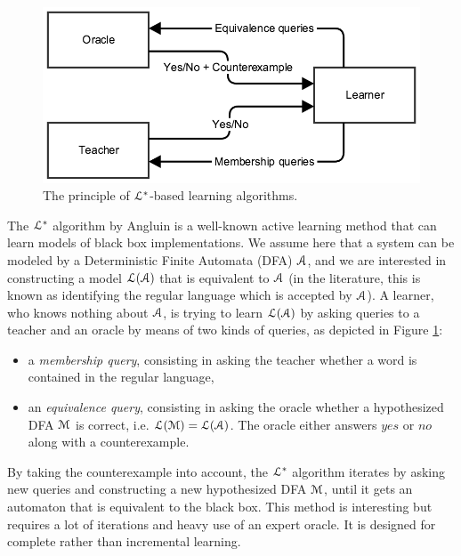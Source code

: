 \begin{figure}[h]
    \begin{center}
        \includegraphics[width=0.9\linewidth]{figures/angluin.png}
    \end{center}

    \caption{The principle of $\EuScript{L}^*$-based learning
    algorithms.}
    \label{fig:angluin}
\end{figure}

The $\EuScript{L}^*$ algorithm by Angluin \cite{Angluin198787} is
a well-known active learning method that can learn models of
black box implementations. We assume here that a system can be
modeled by a Deterministic Finite Automata (DFA) $\EuScript{A}$,
and we are interested in constructing a model
$\EuScript{L}(\EuScript{A})$ that is equivalent to $\EuScript{A}$
(in the literature, this is known as identifying the regular
language which is accepted by $\EuScript{A}$). A learner, who
knows nothing about $\EuScript{A}$, is trying to learn
$\EuScript{L}(\EuScript{A})$ by asking queries to a teacher and
an oracle by means of two kinds of queries, as depicted in Figure
\ref{fig:angluin}:

\begin{itemize}
\item a \textit{membership query}, consisting in asking the
teacher whether a word is contained in the regular language,

\item an \textit{equivalence query}, consisting in asking the
oracle whether a hypothesized DFA $\EuScript{M}$ is correct, i.e.
$\EuScript{L}(\EuScript{M}) = \EuScript{L}(\EuScript{A})$.  The
oracle either answers $yes$ or $no$ along with a counterexample.
\end{itemize}

By taking the counterexample into account, the $\EuScript{L}^*$
algorithm iterates by asking new queries and constructing a new
hypothesized DFA $\EuScript{M}$, until it gets an automaton that
is equivalent to the black box.  This method is interesting but
requires a lot of iterations and heavy use of an expert oracle.
It is designed for complete rather than incremental learning.

